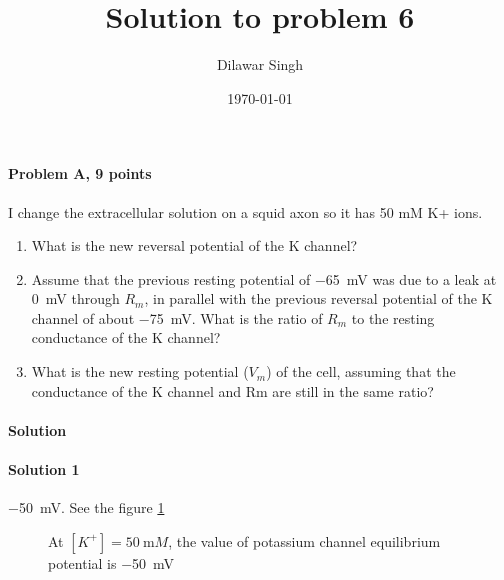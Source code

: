 \documentclass[a4paper,10pt]{article}
\title{Solution to problem 6}
\author{Dilawar Singh}
\date{\today}
\begin{document}
\maketitle

\paragraph{Problem A, 9 points}

I change the extracellular solution on a squid axon so it has 50 mM K+ ions. 

\begin{enumerate}
    \item What is the new reversal potential of the K channel?  
    \item Assume that the previous resting potential of \SI{-65}{\milli\volt} was 
        due to a leak at \SI{0}{\milli \volt} through $R_m$, in parallel with the 
        previous reversal potential of the K channel of about 
        \SI{-75}{\milli \volt}. What is the ratio of $R_m$ to the resting 
        conductance of the K channel?
    \item What is the new resting potential ($V_m$) of the cell, assuming that 
        the conductance of the K channel and Rm are still in the same ratio?
\end{enumerate}

\paragraph{Solution} 

\paragraph{Solution 1} \SI{-50}{\milli \volt}. See the figure \ref{fig:problema}

\begin{figure}[ht!]
\begin{center}
\end{center}
\caption{At $[K^+] =\SI{50}{\milli M}$, the value of potassium channel
equilibrium potential is \SI{-50}{\milli \volt} }
\label{fig:problema}
\end{figure}
\end{document}
